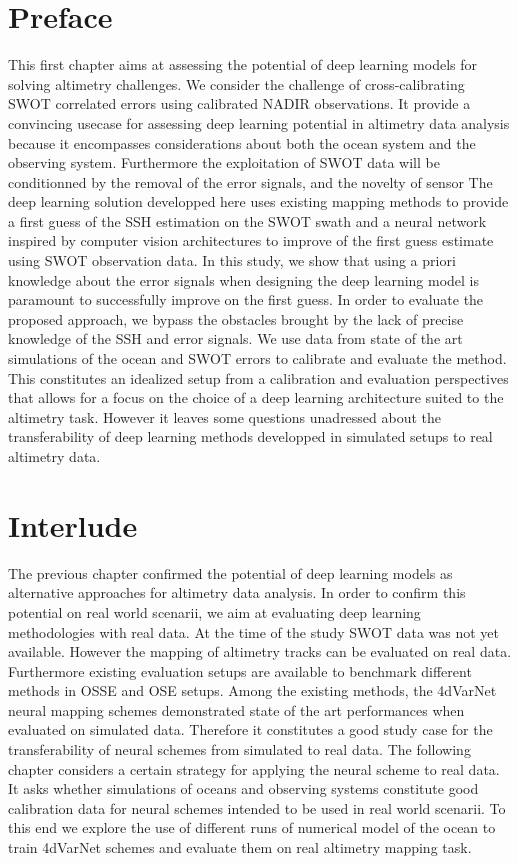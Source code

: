 
\section{Preface}
This first chapter aims at assessing the potential of deep learning models for solving altimetry challenges.
We consider the challenge of cross-calibrating SWOT correlated errors using calibrated NADIR observations.
It provide a convincing usecase for assessing deep learning potential in altimetry data analysis because it encompasses considerations about both the ocean system and the observing system.
Furthermore the exploitation of SWOT data will be conditionned by the removal of the error signals, and the novelty of sensor
The deep learning solution developped here uses existing mapping methods to provide a first guess of the SSH estimation on the SWOT swath and a neural network inspired by computer vision architectures to improve of the first guess estimate using SWOT observation data.
In this study, we show that using a priori knowledge about the error signals when designing the deep learning model is paramount to successfully improve on the first guess.
In order to evaluate the proposed approach, we bypass the obstacles brought by the lack of precise knowledge of the SSH and error signals. We use data from state of the art simulations of the ocean and  SWOT errors to calibrate and evaluate the method. This constitutes an idealized setup from a calibration and evaluation perspectives that allows for a focus on the choice of a deep learning architecture suited to the altimetry task.
However it leaves some questions unadressed about the transferability of deep learning methods developped in simulated setups to real altimetry data.


\section{Interlude}
The previous chapter confirmed the potential of deep learning models as alternative approaches for altimetry data analysis. In order to confirm this potential on real world scenarii, we aim at evaluating deep learning methodologies with real data.
At the time of the study SWOT data was not yet available. However the mapping of altimetry tracks can be evaluated on real data.
Furthermore existing evaluation setups are available to benchmark different methods in OSSE and OSE setups.
Among the existing methods, the 4dVarNet neural mapping schemes demonstrated state of the art performances when evaluated on simulated data. Therefore it constitutes a good study case for the transferability of neural schemes from simulated to real data.
The following chapter considers a certain strategy for applying the neural scheme to real data.
It asks whether simulations of oceans and observing systems constitute good calibration data for neural schemes intended to be used in real world scenarii.
To this end we explore the use of different runs of numerical model of the ocean to train 4dVarNet schemes and evaluate them on real altimetry mapping task.

